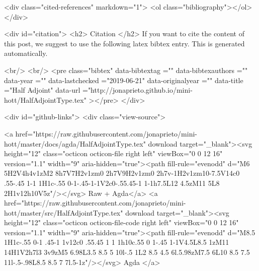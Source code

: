   <div class="cited-references" markdown="1">
  <ol class="bibliography"></ol>
  </div>


  
  <div id="citation">
  <h2> Citation </h2>
  If you want to cite the content of this post,
  we suggest to use the following latex bibtex entry.
  This is generated automatically.

  <br/>
  <br/>
  <pre class="bibtex"
       data-bibtextag =""
       data-bibtexauthors =""
       data-year =""
       data-lastchecked ="2019-06-21"
       data-originalyear =""
       data-title ="Half Adjoint"
       data-url ="http://jonaprieto.github.io/mini-hott/HalfAdjointType.tex"
  ></pre>
  </div>
  

  <div id="github-links">
    <div class="view-source">
      
        <a href="https://raw.githubusercontent.com/jonaprieto/mini-hott/master/docs/agda/HalfAdjointType.tex" download target="_blank"><svg height="12" class="octicon octicon-file right left" viewBox="0 0 12 16" version="1.1" width="9" aria-hidden="true"><path fill-rule="evenodd" d="M6 5H2V4h4v1zM2 8h7V7H2v1zm0 2h7V9H2v1zm0 2h7v-1H2v1zm10-7.5V14c0 .55-.45 1-1 1H1c-.55 0-1-.45-1-1V2c0-.55.45-1 1-1h7.5L12 4.5zM11 5L8 2H1v12h10V5z"/></svg> Raw + Agda</a>
        <a href="https://raw.githubusercontent.com/jonaprieto/mini-hott/master/src/HalfAdjointType.tex" download target="_blank"><svg height="12" class="octicon octicon-file-code right left" viewBox="0 0 12 16" version="1.1" width="9" aria-hidden="true"><path fill-rule="evenodd" d="M8.5 1H1c-.55 0-1 .45-1 1v12c0 .55.45 1 1 1h10c.55 0 1-.45 1-1V4.5L8.5 1zM11 14H1V2h7l3 3v9zM5 6.98L3.5 8.5 5 10l-.5 1L2 8.5 4.5 6l.5.98zM7.5 6L10 8.5 7.5 11l-.5-.98L8.5 8.5 7 7l.5-1z"/></svg> Agda </a>
      
